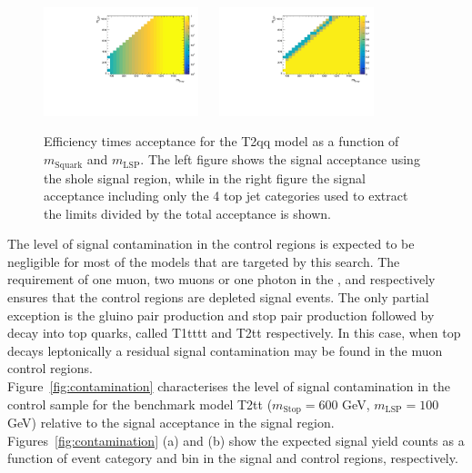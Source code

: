 \begin{figure}[h!]
  \begin{center}
    \includegraphics[width=0.4\textwidth]{figures/jetRanking/T2qq/eff/T2qq_merging_9_cats.pdf} ~~
    \includegraphics[width=0.4\textwidth]{figures/susyResults/T2qq_doubleRatioAcceptance.pdf} \\
    \caption{
      Efficiency times acceptance for the T2qq model as a function of $m_{\mathrm{Squark}}$ and $m_{\mathrm{LSP}}$.
      The left figure shows the signal acceptance using the shole signal region, 
      while in the right figure the signal acceptance including only the 4 top jet categories used to extract the limits divided by the total acceptance is shown.
    }
    \label{fig:sig-eff-T2qq}
  \end{center}
\end{figure}




The level of signal contamination in the control regions is expected to be negligible 
for most of the models that are targeted by this search. 
The requirement of one muon, two muons or one photon in the \mj, \mmj and \gj respectively 
ensures that the control regions are depleted signal events. 
The only partial exception is the gluino pair production and stop pair production followed by decay into top quarks, 
called T1tttt and T2tt respectively. 
In this case, when top decays leptonically a residual signal contamination may be found in the muon control regions. \\

Figure~\ref{fig:contamination} characterises the level of signal
contamination in the \mj control sample for the benchmark model
T2tt ($m_{\mathrm{Stop}}=600$ GeV, $m_{\mathrm{LSP}}=100$ GeV) relative to the signal acceptance in the
signal region. Figures~\ref{fig:contamination} (a) and (b) show the
expected signal yield counts as a function of event category and
\scalht bin in the signal and \mj control regions, respectively.

